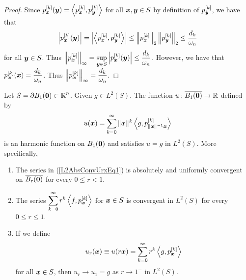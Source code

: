 \begin{proof}
Since $\displaystyle p_{{\bm{x}}}^{[k]}({\bm{y}})
= \left\langle{p_{{\bm{x}}}^{[k]}} , {p_{{\bm{y}}}^{[k]}}\right\rangle$ for all
${\bm{x}},{\bm{y}} \in S$ by definition of
$\displaystyle p_{{\bm{y}}}^{[k]}$, we have that
\[
  \left| p_{{\bm{x}}}^{[k]}({\bm{y}}) \right|
= \left| \left\langle{p_{{\bm{x}}}^{[k]}} , {p_{{\bm{y}}}^{[k]}}\right\rangle \right|
\leq \left\|p_{{\bm{x}}}^{[k]}\right\|_2 \left\|p_{{\bm{y}}}^{[k]}\right\|_2
\leq \frac{d_k}{\omega_n}
\]
for all ${\bm{y}} \in S$.  Thus
$\displaystyle \left\|p_{{\bm{x}}}^{[k]}\right\|_\infty
= \sup_{{\bm{y}} \in S} \left| p_{{\bm{x}}}^{[k]}({\bm{y}}) \right| \leq
\frac{d_k}{\omega_n}$.  However, we have that
$\displaystyle p_{{\bm{x}}}^{[k]}({\bm{x}}) = \frac{d_k}{\omega_n}$.
Thus
$\displaystyle \left\|p_{{\bm{x}}}^{[k]}\right\|_\infty
= \frac{d_k}{\omega_n}$.
\end{proof}

\begin{theorem} \label{L2AbsConvUrx}
Let $\displaystyle S = \partial B_1({\bm{0}}) \subset \mathbb{R}^n$.
Given $\displaystyle g \in L^2(S)$.  The function
$u: \overline{B_1({\bm{0}})} \to \mathbb{R}$
defined by
\begin{equation} \label{L2AbsConvUrxEq1}
u({\bm{x}}) = \sum_{k=0}^\infty \|{\bm{x}}\|^k
\left\langle{g} , {p_{\|{\bm{x}}\|^{-1}{\bm{x}}}^{[k]}}\right\rangle
\end{equation}
is an harmonic function on $B_1({\bm{0}})$ and satisfies $u = g$
in $\displaystyle L^2(S)$.  More specifically,
{\renewcommand{\labelenumi}{\roman{enumi})}
\begin{enumerate}
\item The series in (\ref{L2AbsConvUrxEq1}) is absolutely and
uniformly convergent on $\overline{B_r({\bm{0}})}$ for every $0 \leq r <1$.
\item The series $\displaystyle
\sum_{k=0}^\infty r^k \left\langle{f} , {p_{{\bm{x}}}^{[k]}}\right\rangle$ for ${\bm{x}} \in S$ is
convergent in $\displaystyle L^2(S)$ for every $0 \leq r \leq 1$.
\item If we define
\[
u_r({\bm{x}}) \equiv u(r{\bm{x}}) = \sum_{k=0}^\infty r^k \left\langle{g} , {p_{{\bm{x}}}^{[k]}}\right\rangle
\]
for all ${\bm{x}} \in S$, then $u_r \to u_1 = g$ as $r\to 1^-$ in
$\displaystyle L^2(S)$.
\end{enumerate}
}
\end{theorem}

